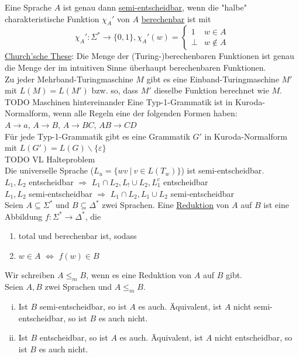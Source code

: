 \documentclass[a4paper]{article}
\newcommand{\ul}{\underline}
\let\epsilon\varepsilon
\begin{document}
Eine Sprache $A$ ist genau dann \ul{semi-entscheidbar}, wenn die "halbe" charakteristische Funktion $\chi_A'$ von $A$ \ul{berechenbar} ist mit $$\chi_A':\Sigma^*\rightarrow\{0,1\}, \chi_A'(w)=\begin{cases}
1 & w\in A\\
\bot & w\notin A
\end{cases}$$
\ul{Church'sche These}: Die Menge der (Turing-)berechenbaren Funktionen ist genau die Menge der im intuitiven Sinne überhaupt berechenbaren Funktionen.\\
Zu jeder Mehrband-Turingmaschine $M$ gibt es eine Einband-Turingmaschine $M'$ mit $L(M)=L(M')$ bzw. so, dass $M'$ dieselbe Funktion berechnet wie $M$.\\
TODO Maschinen hintereinander
Eine Typ-1-Grammatik ist in Kuroda-Normalform, wenn alle Regeln eine der folgenden Formen haben:\\
$A\rightarrow a$, $A\rightarrow B$, $A\rightarrow BC$, $AB\rightarrow CD$\\
Für jede Typ-1-Grammatik gibt es eine Grammatik $G'$ in Kuroda-Normalform mit $L(G')=L(G)\backslash\{\epsilon\}$\\
TODO VL Halteproblem\\
Die universelle Sprache ($L_u=\{wv\ \vert\ v\in L(T_w)\}$) ist semi-entscheidbar.\\
$L_1,L_2$ entscheidbar $\Rightarrow$ $L_1\cap L_2,L_!\cup L_2,L_1^c$ entscheidbar\\
$L_1,L_2$ semi-entscheidbar $\Rightarrow$ $L_1\cap L_2,L_1\cup L_2$ semi-entscheidbar\\
Seien $A\subseteq\Sigma^*$ und $B\subseteq \Delta^*$ zwei Sprachen. Eine \ul{Reduktion} von $A$ auf $B$ ist eine Abbildung $f:\Sigma^*\rightarrow\Delta^*$, die
\begin{enumerate}[1)]
	\item total und berechenbar ist, sodass
	\item $w\in A$ $\Leftrightarrow$ $f(w)\in B$
\end{enumerate}
Wir schreiben $A\leq_m B$, wenn es eine Reduktion von $A$ auf $B$ gibt.\\
Seien $A,B$ zwei Sprachen und $A\leq_m B$.
\begin{enumerate}[(i)]
	\item Ist $B$ semi-entscheidbar, so ist $A$ es auch. Äquivalent, ist $A$ nicht semi-entscheidbar, so ist $B$ es auch nicht.
	\item Ist $B$ entscheidbar, so ist $A$ es auch. Äquivalent, ist $A$ nicht entscheidbar, so ist $B$ es auch nicht.
\end{enumerate}
\end{document}
